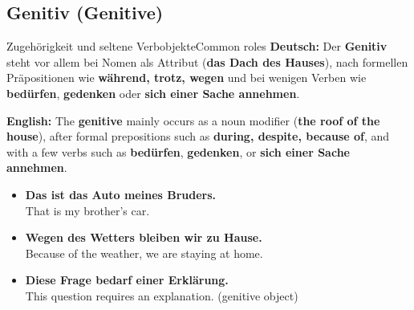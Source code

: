 \documentclass[a4paper,11pt]{article}
\newcommand{\GermanText}[1]{\textbf{Deutsch: }#1\par}
\newcommand{\EnglishText}[1]{{\small\color{SoftGray}\textbf{English: }#1\par}}
\newcommand{\ExampleItem}[2]{\item \textbf{#1}\\{\small\color{SoftGray}#2}}
\begin{document}
        \subsection{Genitiv \textnormal{(Genitive)}}
            \begin{grammarentry}{Zugehörigkeit und seltene Verbobjekte}{Common roles}
                \GermanText{Der \textbf{Genitiv} steht vor allem bei Nomen als Attribut (\textbf{das Dach des Hauses}), nach formellen Präpositionen wie \textbf{während, trotz, wegen} und bei wenigen Verben wie \textbf{bedürfen}, \textbf{gedenken} oder \textbf{sich einer Sache annehmen}.}
                \EnglishText{The \textbf{genitive} mainly occurs as a noun modifier (\textbf{the roof of the house}), after formal prepositions such as \textbf{during, despite, because of}, and with a few verbs such as \textbf{bedürfen}, \textbf{gedenken}, or \textbf{sich einer Sache annehmen}.}
            \end{grammarentry}
            \begin{exbox}\begin{itemize}
                \ExampleItem{Das ist das Auto meines Bruders.}{That is my brother's car.}
                \ExampleItem{Wegen des Wetters bleiben wir zu Hause.}{Because of the weather, we are staying at home.}
                \ExampleItem{Diese Frage bedarf einer Erklärung.}{This question requires an explanation. (genitive object)}
            \end{itemize}\end{exbox}
\end{document}
